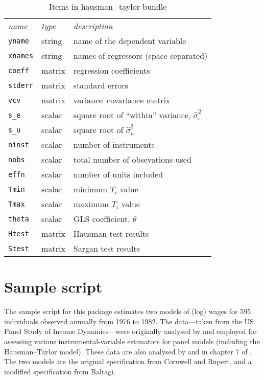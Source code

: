 \documentclass{article}
\begin{document}
\begin{table}[htbp]
\centering
\begin{tabular}{llp{}}
  \textit{name}   & \textit{type} & \textit{description} \\[4pt]
  \texttt{yname} & string & name of the dependent variable \\
  \texttt{xnames} & string & names of regressors (space separated) \\
  \texttt{coeff} & matrix & regression coefficients \\
  \texttt{stderr} & matrix & standard errors \\
  \texttt{vcv} & matrix & variance--covariance matrix \\
  \texttt{s\_e} & scalar & square root of ``within'' variance, 
    $\hat{\sigma}^2_{\epsilon}$ \\
  \texttt{s\_u} & scalar & square root of $\hat{\sigma}^2_{u}$ \\
  \texttt{ninst} & scalar & number of instruments \\
  \texttt{nobs} & scalar & total number of obsevations used \\
  \texttt{effn} & scalar & number of units included \\
  \texttt{Tmin} & scalar & minimum $T_i$ value \\
  \texttt{Tmax} & scalar & maximum $T_i$ value \\
  \texttt{theta} & scalar & GLS coefficient, $\theta$ \\
  \texttt{Htest} & matrix & Hausman test results \\
  \texttt{Stest} & matrix & Sargan test results \\
\end{tabular}
\caption{Items in hausman\_taylor bundle}
\label{tab:bun}
\end{table}

\section{Sample script}

The sample script for this package estimates two models of (log) wages
for 595 individuals observed annually from 1976 to 1982.  The
data---taken from the US Panel Study of Income Dynamics---were
originally analysed by \cite{cornwell88} and employed for assessing
various instrumental-variable estimators for panel models (including
the Hausman--Taylor model). These data are also analysed by
\cite{baltagi-akom90} and in chapter 7 of \cite{baltagi05}. The two
models are the original specification from Cornwell and Rupert, and a
modified specification from Baltagi.
\end{document}
